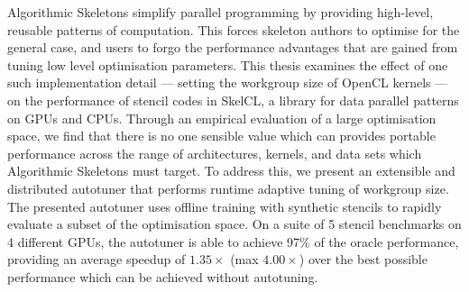 Algorithmic Skeletons simplify parallel programming by providing
high-level, reusable patterns of computation. This forces skeleton
authors to optimise for the general case, and users to forgo the
performance advantages that are gained from tuning low level
optimisation parameters. This thesis examines the effect of one such
implementation detail --- setting the workgroup size of OpenCL kernels
--- on the performance of stencil codes in SkelCL, a library for data
parallel patterns on GPUs and CPUs. Through an empirical evaluation of
a large optimisation space, we find that there is no one sensible
value which can provides portable performance across the range of
architectures, kernels, and data sets which Algorithmic Skeletons must
target. To address this, we present an extensible and distributed
autotuner that performs runtime adaptive tuning of workgroup size. The
presented autotuner uses offline training with synthetic stencils to
rapidly evaluate a subset of the optimisation space. On a suite of 5
stencil benchmarks on 4 different GPUs, the autotuner is able to
achieve 97\% of the oracle performance, providing an average speedup
of $1.35\times$ (max $4.00\times$) over the best possible performance
which can be achieved without autotuning.

